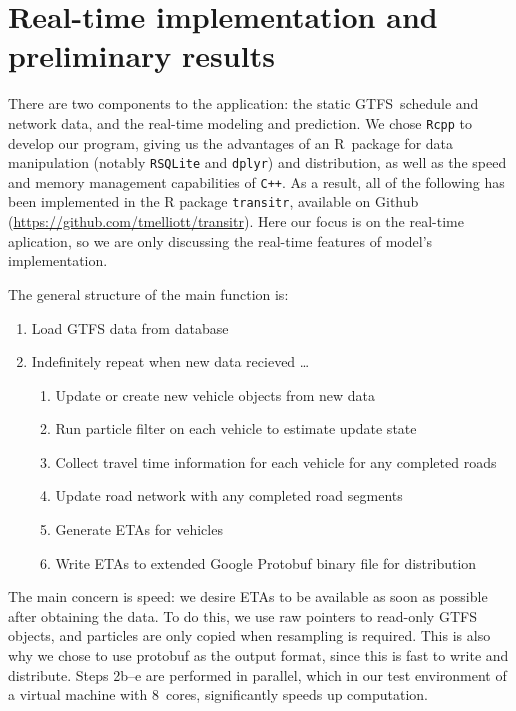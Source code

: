 \section{Real-time implementation and preliminary results}
\label{sec:rt}

There are two components to the application:
the static GTFS~schedule and network data,
and the real-time modeling and prediction.
We chose \verb+Rcpp+ to develop our program,
giving us the advantages of an R~package for data manipulation 
(notably \verb+RSQLite+ and \verb+dplyr+)
and distribution, 
as well as the speed and memory management capabilities of \verb|C++|. 
As a result, all of the following has been implemented in the R package
\verb+transitr+, available on Github (\url{https://github.com/tmelliott/transitr}).
Here our focus is on the real-time aplication, so we are only discussing the real-time 
features of model's implementation.

The general structure of the main function is:
\begin{enumerate}
\item Load GTFS data from database
\item Indefinitely repeat when new data recieved \ldots
\begin{enumerate}
    \item Update or create new vehicle objects from new data
    \item Run particle filter on each vehicle to estimate update state
    \item Collect travel time information for each vehicle for any completed roads
    \item Update road network with any completed road segments
    \item Generate ETAs for vehicles
    \item Write ETAs to extended Google Protobuf binary file for distribution
\end{enumerate}
\end{enumerate}

The main concern is speed: 
we desire ETAs to be available as soon as possible after obtaining the data.
To do this, we use raw pointers to read-only GTFS objects,
and particles are only copied when resampling is required.
This is also why we chose to use protobuf as the output format,
since this is fast to write and distribute.
Steps 2b--e are performed in parallel, 
which in our test environment of a virtual machine with 8~cores, 
significantly speeds up computation.


